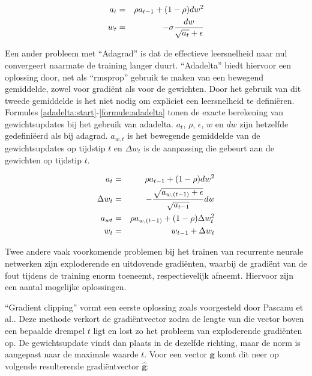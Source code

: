 \begin{eqnarray}
\vspace{-3mm}
    \label{rmsprop:start}
    a_t & = & \rho  a_{t-1} + (1 - \rho)dw^2 \\
    w_t & = &  - \sigma \frac{dw}{\sqrt{a_t} + \epsilon}
    \label{formule:rmsprop}
    \vspace{-3mm}
\end{eqnarray}

Een ander probleem met ``Adagrad'' is dat de effectieve leersnelheid naar nul convergeert naarmate de training langer duurt. ``Adadelta''\cite{Zeiler2012} biedt hiervoor een oplossing door, net als ``rmsprop'' gebruik te maken van een bewegend gemiddelde, zowel voor gradi\"ent als voor de gewichten. Door het gebruik van dit tweede gemiddelde is het niet nodig om expliciet een leersnelheid te defini\"eren. Formules \eqref{adadelta:start}-\eqref{formule:adadelta} tonen de exacte berekening van gewichtsupdates bij het gebruik van adadelta. $a_t$, $\rho$, $\epsilon$, $w$ en $dw$ zijn hetzelfde gedefini\"eerd als bij adagrad. $a_{w,t}$ is het bewegende gemiddelde van de gewichtsupdates op tijdstip $t$ en $\Delta w_t$ is de aanpassing die gebeurt aan de gewichten op tijdstip $t$.

\begin{eqnarray}
\vspace{-3mm}
    \label{adadelta:start}
    a_t & = & \rho  a_{t-1} + (1 - \rho)dw^2 \\
    \Delta w_t & = & - \frac{\sqrt{a_{w,(t-1)} + \epsilon}}{\sqrt{a_{t-1}}}dw \\
    a_{wt} & = & \rho  a_{w,(t-1)} + (1 - \rho)\Delta w_t^2 \\
    w_t & = & w_{t-1} + \Delta w_t
    \label{formule:adadelta}
    \vspace{-3mm}
\end{eqnarray}


Twee andere vaak voorkomende problemen bij het trainen van recurrente neurale netwerken zijn exploderende en uitdovende gradi\"enten, waarbij de gradi\"ent van de fout tijdens de training enorm toeneemt, respectievelijk afneemt. Hiervoor zijn een aantal mogelijke oplossingen.

``Gradient clipping'' vormt een eerste oplossing zoals voorgesteld door Pascanu et al.\cite{Pascanu2012}. Deze methode verkort de gradi\"entvector zodra de lengte van die vector boven een bepaalde drempel $t$ ligt en lost zo het probleem van exploderende gradi\"enten op. De gewichtsupdate vindt dan plaats in de dezelfde richting, maar de norm is aangepast naar de maximale waarde $t$. Voor een vector $\mathbf{g}$ komt dit neer op volgende resulterende gradi\"entvector $\mathbf{\hat{g}}$:


